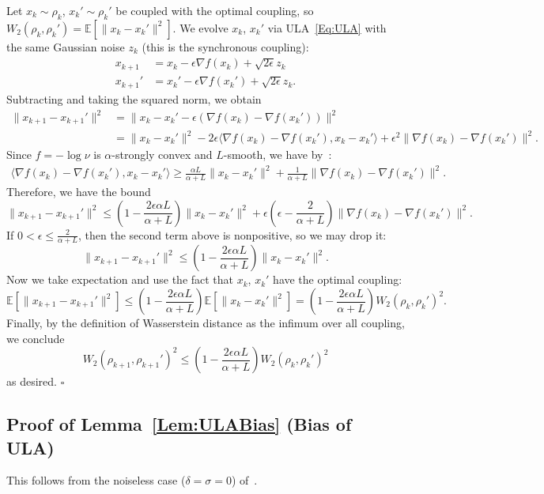 \documentclass[final,12pt]{colt2018}
\newcommand{\E}{\mathbb{E}}
\begin{document}
Let $x_k \sim \rho_k$, $x_k' \sim \rho_k'$ be coupled with the optimal coupling, so $W_2(\rho_k,\rho_k') = \E[\|x_k-x_k'\|^2]$.
We evolve $x_k$, $x_k'$ via ULA~\eqref{Eq:ULA} with the same Gaussian noise $z_k$ (this is the synchronous coupling):
\begin{align*}
x_{k+1} &= x_k - \epsilon \nabla f(x_k) + \sqrt{2\epsilon} z_k \\
x_{k+1}' &= x_k' - \epsilon \nabla f(x_k') + \sqrt{2\epsilon} z_k.
\end{align*}
Subtracting and taking the squared norm, we obtain
\begin{align*}
\|x_{k+1}-x_{k+1}'\|^2 &= \|x_k - x_k' - \epsilon (\nabla f(x_k) - \nabla f(x_k'))\|^2 \\
&= \|x_k-x_k'\|^2 - 2\epsilon \langle \nabla f(x_k) - \nabla f(x_k'), x_k-x_k' \rangle + \epsilon^2 \|\nabla f(x_k) - \nabla f(x_k')\|^2.
\end{align*}
Since $f = -\log \nu$ is $\alpha$-strongly convex and $L$-smooth, we have by~\cite[Theorem~2.1.12]{Nesterov04}:
\begin{align}\label{Eq:Nest}
\langle \nabla f(x_k) - \nabla f(x_k'), x_k-x_k' \rangle \ge \frac{\alpha L}{\alpha+L} \|x_k-x_k'\|^2 + \frac{1}{\alpha+L} \|\nabla f(x_k)-\nabla f(x_k')\|^2.
\end{align}
Therefore, we have the bound
$$\|x_{k+1}-x_{k+1}'\|^2 \le \left(1-\frac{2\epsilon \alpha L}{\alpha+L}\right) \|x_k-x_k'\|^2 + \epsilon \left(\epsilon - \frac{2}{\alpha+L}\right)\|\nabla f(x_k)-\nabla f(x_k')\|^2.$$
If $0 < \epsilon \le \frac{2}{\alpha+L}$, then the second term above is nonpositive, so we may drop it:
$$\|x_{k+1}-x_{k+1}'\|^2 \le \left(1-\frac{2\epsilon \alpha L}{\alpha+L}\right) \|x_k-x_k'\|^2.$$
Now we take expectation and use the fact that $x_k$, $x_k'$ have the optimal coupling:
$$\E[\|x_{k+1}-x_{k+1}'\|^2] \le \left(1-\frac{2\epsilon \alpha L}{\alpha+L}\right) \E[\|x_k-x_k'\|^2]
=  \left(1-\frac{2\epsilon \alpha L}{\alpha+L}\right) W_2(\rho_k,\rho_k')^2.$$
Finally, by the definition of Wasserstein distance as the infimum over all coupling, we conclude
$$W_2(\rho_{k+1},\rho_{k+1}')^2 \le  \left(1-\frac{2\epsilon \alpha L}{\alpha+L}\right) W_2(\rho_k,\rho_k')^2$$
as desired.
\hfill$\square$


\subsection{Proof of Lemma~\ref{Lem:ULABias} (Bias of ULA)}

This follows from the noiseless case ($\delta = \sigma = 0$) of~\citep[Theorem~4]{DK17}.
\end{document}
